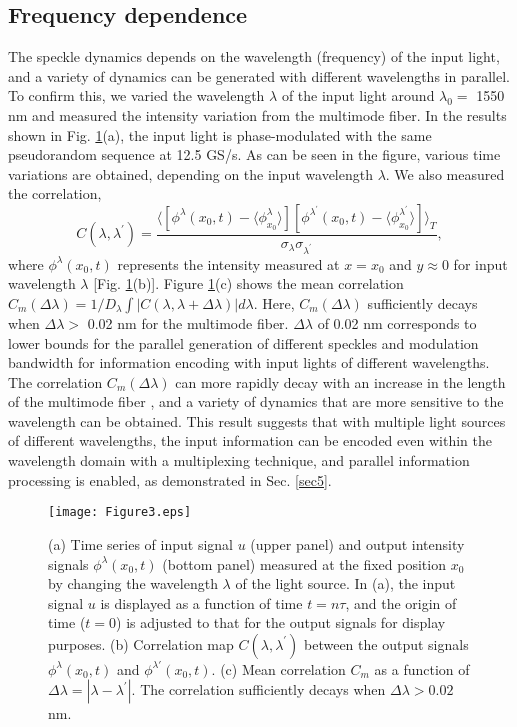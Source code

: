 \documentclass{article}
\begin{document}
\subsection{Frequency dependence \label{sec_f}}
The speckle dynamics depends on the wavelength (frequency) of the input light, 
and a variety of dynamics can be generated with different wavelengths in parallel.  
%
To confirm this, we varied the wavelength $\lambda$ of the input light
around $\lambda_0 = $ 1550 nm and measured the intensity variation from the
multimode fiber. 
%
In the results shown in Fig. \ref{fig3}(a), the input light is 
phase-modulated with the same pseudorandom sequence at 12.5 GS/s. 
%
As can be seen in the figure, various time variations are obtained, depending on
the input wavelength $\lambda$. 
%
We also measured the correlation, 
\begin{equation}
C(\lambda,\lambda^{'})=
\dfrac{
\langle 
\left[
\phi^{\lambda}(x_0,t)
-\langle \phi_{x_0}^{\lambda}\rangle 
\right]
[
\phi^{\lambda^{'}}(x_0,t)
-\langle \phi_{x_0}^{\lambda^{'}}\rangle 
]
\rangle_T
}
{
\sigma_\lambda\sigma_{\lambda^{'}}
}, 
\end{equation}
where 
$\phi^\lambda(x_0,t)$ represents the intensity measured at $x=x_0$ and
$y\approx 0$ for input wavelength $\lambda$ [Fig. \ref{fig3}(b)].
%
Figure \ref{fig3}(c) shows the mean correlation 
$C_m(\Delta\lambda)
 = 1/D_\lambda\int |C(\lambda,\lambda+\Delta\lambda)|d\lambda
$. 
%
Here, $C_m(\Delta\lambda)$ sufficiently decays when $\Delta\lambda >$ 0.02 nm
for the multimode fiber.
$\Delta\lambda$ of 0.02 nm corresponds to lower bounds for 
the parallel generation of different speckles and modulation 
bandwidth for information encoding with input lights of different wavelengths.
%
The correlation $C_m(\Delta\lambda)$ can more rapidly decay with an increase in the length of 
the multimode fiber \cite{Redding2013}, 
and a variety of dynamics that are more
sensitive to the wavelength can be obtained.
%
This result suggests that with multiple light sources of
different wavelengths, the input information can be encoded even within the
wavelength domain with a multiplexing technique, and parallel information
processing is enabled, as demonstrated in Sec. \ref{sec5}. 
%
\begin{figure}[htbp]
\centering\texttt{[image: Figure3.eps]}
\caption{\label{fig3}
(a) Time series of input signal $u$ (upper panel) and output intensity
 signals $\phi^{\lambda}(x_0,t)$ (bottom panel)
 measured at the fixed position $x_0$ by changing the wavelength
 $\lambda$ of the light source. 
%
In (a), the input signal $u$ is displayed as a function of time $t=n\tau$, and the origin of
 time ($t = 0$) is adjusted to that for the output signals for display purposes. 
%
(b) Correlation map $C(\lambda,\lambda^{'})$ between the output signals
 $\phi^{\lambda}(x_0,t)$ and $\phi^{\lambda'}(x_0,t)$.
%
(c) Mean correlation $C_m$ as a function of $\Delta \lambda = |\lambda-\lambda^{'}|$. 
%
The correlation sufficiently decays when $\Delta \lambda > 0.02$ nm.  
%
}
\end{figure}
%
\end{document}
